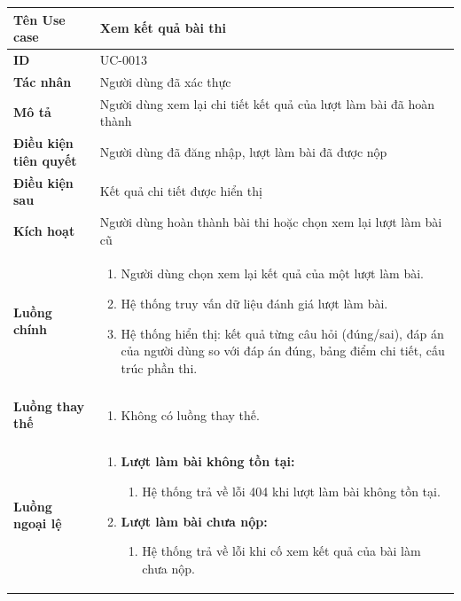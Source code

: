 {
\renewcommand{\arraystretch}{1.5}

\begin{tabularx}{\textwidth}{|>{\raggedright\arraybackslash}X|>{\raggedright\arraybackslash}X|}
\hline
\textbf{Tên Use case} & Xem kết quả bài thi \\
\hline
\textbf{ID} & UC-0013 \\
\hline
\textbf{Tác nhân} & Người dùng đã xác thực \\
\hline
\textbf{Mô tả} & Người dùng xem lại chi tiết kết quả của lượt làm bài đã hoàn thành \\
\hline
\textbf{Điều kiện tiên quyết} & Người dùng đã đăng nhập, lượt làm bài đã được nộp \\
\hline
\textbf{Điều kiện sau} & Kết quả chi tiết được hiển thị \\
\hline
\textbf{Kích hoạt} & Người dùng hoàn thành bài thi hoặc chọn xem lại lượt làm bài cũ \\
\hline
\textbf{Luồng chính} &
\begin{enumerate}
    \item Người dùng chọn xem lại kết quả của một lượt làm bài.
    \item Hệ thống truy vấn dữ liệu đánh giá lượt làm bài.
    \item Hệ thống hiển thị: kết quả từng câu hỏi (đúng/sai), đáp án của người dùng so với đáp án đúng, bảng điểm chi tiết, cấu trúc phần thi.
\end{enumerate} \\
\hline
\textbf{Luồng thay thế} &
\begin{enumerate}
    \item Không có luồng thay thế.
\end{enumerate} \\
\hline
\textbf{Luồng ngoại lệ} &
\begin{enumerate}
    \item \textbf{Lượt làm bài không tồn tại:}
    \begin{enumerate}
        \item[2Err.] Hệ thống trả về lỗi 404 khi lượt làm bài không tồn tại.
    \end{enumerate}
    \item \textbf{Lượt làm bài chưa nộp:}
    \begin{enumerate}
        \item[2Err2.] Hệ thống trả về lỗi khi cố xem kết quả của bài làm chưa nộp.
    \end{enumerate}
\end{enumerate} \\
\hline
\end{tabularx}
}
